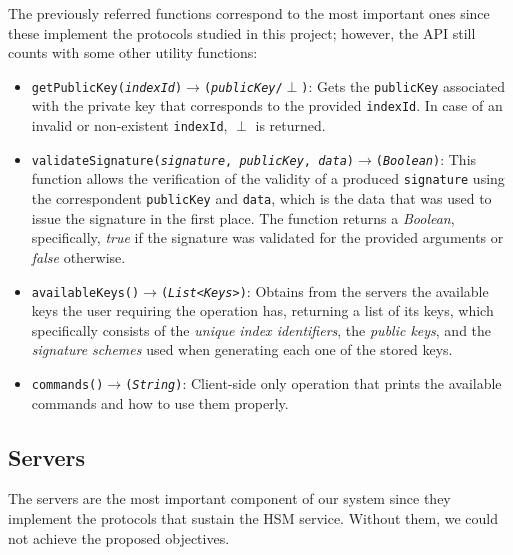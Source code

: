 The previously referred functions correspond to the most important ones since these implement the protocols studied in this project; however, the API still counts with some other utility functions:

\begin{itemize}
    \item \texttt{getPublicKey(\textit{indexId})$\longrightarrow$(\textit{publicKey}/$\perp$)}: Gets the \texttt{publicKey} associated with the private key that corresponds to the provided \texttt{indexId}. In case of an invalid or non-existent \texttt{indexId}, $\perp$ is returned.
    
    \item \texttt{validateSignature(\textit{signature}, \textit{publicKey}, \textit{data})$\longrightarrow$(\textit{Boolean})}: This function allows the verification of the validity of a produced \texttt{signature} using the correspondent \texttt{publicKey} and \texttt{data}, which is the data that was used to issue the signature in the first place. The function returns a \textit{Boolean}, specifically, \textit{true} if the signature was validated for the provided arguments or \textit{false} otherwise.

    \item \texttt{availableKeys()$\longrightarrow$(\textit{List<Keys>})}: Obtains from the servers the available keys the user requiring the operation has, returning a list of its keys, which specifically consists of the \textit{unique index identifiers}, the \textit{public keys}, and the \textit{signature schemes} used when generating each one of the stored keys.

    \item \texttt{commands()$\longrightarrow$(\textit{String})}: Client-side only operation that prints the available commands and how to use them properly.  
\end{itemize}


\subsection{Servers} \label{subsec:servers}
The servers are the most important component of our system since they implement the protocols that sustain the HSM service. Without them, we could not achieve the proposed objectives. 

